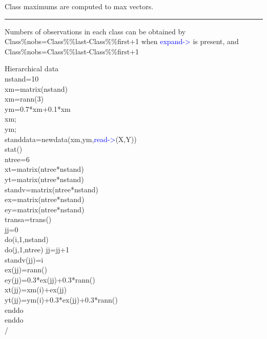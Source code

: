 \begin{changemargin}{3cm}{0cm}
\noindent  Class maximums are computed to max vectors.
\end {changemargin}
\hrule
\vspace{0.2cm}
\begin{note}
Numbers of observations in each class can be obtained by \\
Class\%nobs=Class\%\%last-Class\%\%first+1 when \textcolor{blue}{expand->} is present, and \\
Class\%nobs=Class\%\%last-Class\%\%first+1
\end{note}
\begin{example}[classdata]Hierarchical data\\
\label{classdata}
nstand=10\\
xm=\textcolor{VioletRed}{matrix}(nstand)\\
xm=\textcolor{VioletRed}{rann}(3)\\
ym=0.7*xm+0.1*xm\\
xm;\\
ym;\\
standdata=\textcolor{VioletRed}{newdata}(xm,ym,\textcolor{blue}{read->}(X,Y))\\
\textcolor{VioletRed}{stat}()\\
ntree=6\\
xt=\textcolor{VioletRed}{matrix}(ntree*nstand)\\
yt=\textcolor{VioletRed}{matrix}(ntree*nstand)\\
standv=\textcolor{VioletRed}{matrix}(ntree*nstand)\\
ex=\textcolor{VioletRed}{matrix}(ntree*nstand)\\
ey=\textcolor{VioletRed}{matrix}(ntree*nstand)\\
transa=\textcolor{VioletRed}{trans}()\\
jj=0\\
\textcolor{VioletRed}{do}(i,1,nstand)\\
\textcolor{VioletRed}{do}(j,1,ntree)
jj=jj+1\\
standv(jj)=i\\
ex(jj)=\textcolor{VioletRed}{rann}()\\
ey(jj)=0.3*ex(jj)+0.3*rann()\\
xt(jj)=xm(i)+ex(jj)\\
yt(jj)=ym(i)+0.3*ex(jj)+0.3*rann()\\
enddo\\
enddo\\
/\\

\end{example}
